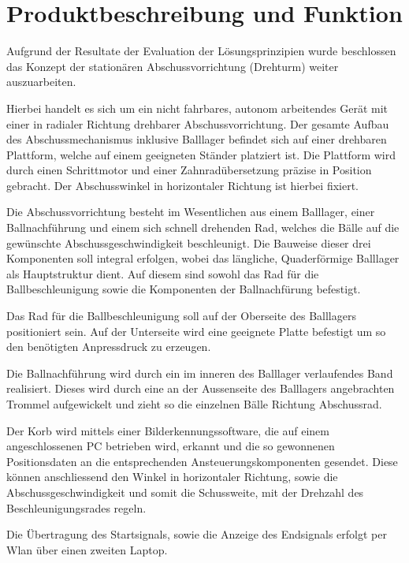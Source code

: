 \section{Produktbeschreibung und Funktion}

Aufgrund der Resultate der Evaluation der Lösungsprinzipien wurde beschlossen 
das Konzept der stationären Abschussvorrichtung (Drehturm) weiter 
auszuarbeiten. 

Hierbei handelt es sich um ein nicht fahrbares, autonom arbeitendes Gerät mit 
einer in radialer Richtung drehbarer Abschussvorrichtung. Der gesamte Aufbau 
des Abschussmechanismus inklusive Balllager befindet sich auf einer drehbaren 
Plattform, welche auf einem geeigneten Ständer platziert ist. Die Plattform 
wird durch einen Schrittmotor und einer Zahnradübersetzung präzise in Position 
gebracht. Der Abschusswinkel in horizontaler Richtung ist hierbei fixiert. 

Die Abschussvorrichtung besteht im Wesentlichen aus einem Balllager, einer 
Ballnachführung und einem sich schnell drehenden Rad, welches die Bälle auf 
die gewünschte Abschussgeschwindigkeit beschleunigt. Die Bauweise dieser drei 
Komponenten soll integral erfolgen, wobei das längliche, Quaderförmige 
Balllager als Hauptstruktur dient. Auf diesem sind sowohl das Rad für die 
Ballbeschleunigung sowie die Komponenten der Ballnachfürung befestigt.

Das Rad für die Ballbeschleunigung soll auf der Oberseite des Balllagers 
positioniert sein. Auf der Unterseite wird eine geeignete Platte befestigt um 
so den benötigten Anpressdruck zu erzeugen. 

Die Ballnachführung wird durch ein im inneren des Balllager verlaufendes Band 
realisiert. Dieses wird durch eine an der Aussenseite des Balllagers 
angebrachten Trommel aufgewickelt und zieht so die einzelnen Bälle Richtung 
Abschussrad.

Der Korb wird mittels einer Bilderkennungssoftware, die auf einem 
angeschlossenen PC betrieben wird, erkannt und die so gewonnenen 
Positionsdaten an die entsprechenden Ansteuerungskomponenten gesendet. Diese 
können anschliessend den Winkel in horizontaler Richtung, sowie die 
Abschussgeschwindigkeit und somit die Schussweite, mit der Drehzahl des 
Beschleunigungsrades regeln.

Die Übertragung des Startsignals, sowie die Anzeige des Endsignals erfolgt per 
Wlan über einen zweiten Laptop.
